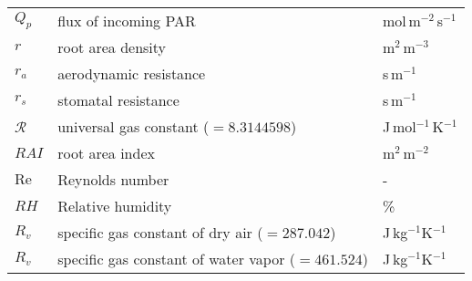 \begin{longtable}{p{}p{}p{}}
	$Q_p$ & flux of incoming PAR & mol\,m$^{-2}$\,s$^{-1}$ \\ 
	$r$ & root area density & m$^{2}$\,m$^{-3}$ \\ 	
	$r_a$ & aerodynamic resistance & s\,m$^{-1}$\\ 
	$r_s$ & stomatal resistance & s\,m$^{-1}$\\ 	
	$\mathcal{R}$ & universal gas constant ($=\num{8.3144598}$) & J\,mol$^{-1}$\,K$^{-1}$ \\ 
	$\textit{RAI}$ & root area index & m$^{2}$\,m$^{-2}$ \\ 	
	${\textrm{Re}}$ & Reynolds number & - \\ 
	${\textit{RH}}$ & Relative humidity & \% \\ 	
	$R_v$ & specific gas constant of dry air ($=\num{287.042}$) & J\,kg$^{-1}$K$^{-1}$ \\ 
	$R_v$ & specific gas constant of water vapor ($=\num{461.524}$) & J\,kg$^{-1}$K$^{-1}$ \\ 


\end{longtable}
